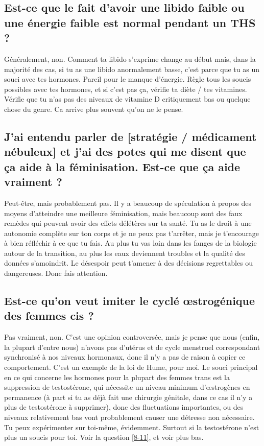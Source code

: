 \documentclass{article}
\begin{document}
\subsection{Est-ce que le fait d'avoir une libido faible ou une énergie faible est normal pendant un THS ?}

Généralement, non. Comment ta libido s'exprime change au début mais, dans la majorité des cas, si tu as une libido anormalement basse, c'est parce que tu as un souci avec tes hormones. Pareil pour le manque d'énergie. Règle tous les soucis possibles avec tes hormones, et si c'est pas ça, vérifie ta diète / tes vitamines. Vérifie que tu n'as pas des niveaux de vitamine D critiquement bas ou quelque chose du genre. Ca arrive plus souvent qu'on ne le pense.

\subsection{J'ai entendu parler de [stratégie / médicament nébuleux] et j'ai des potes qui me disent que ça aide à la féminisation. Est-ce que ça aide vraiment ?}

Peut-être, mais probablement pas. Il y a beaucoup de spéculation à propos des moyens d'atteindre une meilleure féminisation, mais beaucoup sont des faux remèdes qui peuvent avoir des effets délétères sur ta santé. Tu as le droit à une autonomie complète sur ton corps et je ne peux pas t'arrêter, mais je t'encourage à bien réfléchir à ce que tu fais. Au plus tu vas loin dans les fanges de la biologie autour de la transition, au plus les eaux deviennent troubles et la qualité des données s'amoindrit. Le désespoir peut t'amener à des décisions regrettables ou dangereuses. Donc fais attention.

\subsection{Est-ce qu'on veut imiter le cyclé œstrogénique des femmes cis ?}\label{11-10}

Pas vraiment, non. C'est une opinion controversée, mais je pense que nous (enfin, la plupart d'entre nous) n'avons pas d'utérus et de cycle menstruel correspondant synchronisé à nos niveaux hormonaux, donc il n'y a pas de raison à copier ce comportement. C'est un exemple de la loi de Hume, pour moi. Le souci principal en ce qui concerne les hormones pour la plupart des femmes trans est la suppression de testostérone, qui nécessite un niveau minimum d'œstrogènes en permanence (à part si tu as déjà fait une chirurgie génitale, dans ce cas il n'y a plus de testostérone à supprimer), donc des fluctuations importantes, ou des niveaux relativement bas vont probablement causer une détresse non nécessaire. Tu peux expérimenter sur toi-même, évidemment. Surtout si la testostérone n'est plus un soucis pour toi. Voir la question \ref{8-11}, et voir plus bas.
\end{document}

